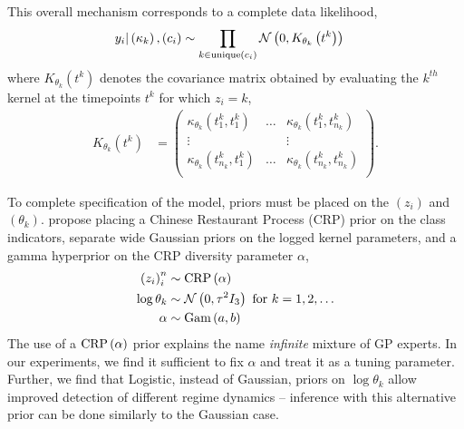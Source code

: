 \documentclass{article}
\begin{document}
This overall mechanism corresponds to a complete data likelihood,
\begin{align*}
 y_i \vert \left(\kappa_k\right), \left(c_i\right) &\sim \prod_{k \in \text{unique}\left(c_i\right)} \mathcal{N}\left(0, K_{\theta_k}\left(t^k\right)\right)
\end{align*}
where $K_{\theta_k}\left(t^k\right)$ denotes the covariance matrix obtained by
evaluating the $k^{th}$ kernel at the timepoints $t^k$ for which $z_i = k$,
\begin{align*}
  K_{\theta_k}\left(t^k\right) &= \begin{pmatrix}
    \kappa_{\theta_k}\left(t^k_1, t^k_1\right) & \dots  & \kappa_{\theta_k}\left(t^k_1, t^k_{n_k}\right) \\
    \vdots & & \vdots \\
    \kappa_{\theta_k}\left(t^k_{n_k}, t^k_1\right) & \dots  & \kappa_{\theta_k}\left(t^k_{n_k}, t^k_{n_k}\right) \\
  \end{pmatrix}.
\end{align*}

To complete specification of the model, priors must be placed on the
$\left(z_i\right)$ and $\left(\theta_k\right)$. \citep{rasmussen2002infinite}
propose placing a Chinese Restaurant Process (CRP) prior on the class indicators,
separate wide Gaussian priors on the logged kernel parameters, and a gamma
hyperprior on the CRP diversity parameter $\alpha$,
\begin{align*}
  \left(z_i\right)_i^n &\sim \textnormal{CRP}\left(\alpha\right) \\
  \log \theta_k &\sim \mathcal{N}\left(0, \tau^2 I_3\right) \text{ for } k = 1, 2, \dots \\
  \alpha &\sim \textnormal{Gam}\left(a, b\right)
\end{align*}
The use of a $\textnormal{CRP}\left(\alpha\right)$ prior explains the name \textit{infinite}
mixture of GP experts. In our experiments, we find it sufficient to fix $\alpha$
and treat it as a tuning parameter. Further, we find that Logistic, instead of
Gaussian, priors on $\log \theta_k$ allow improved detection of different regime
dynamics -- inference with this alternative prior can be done similarly to the
Gaussian case.
\end{document}
